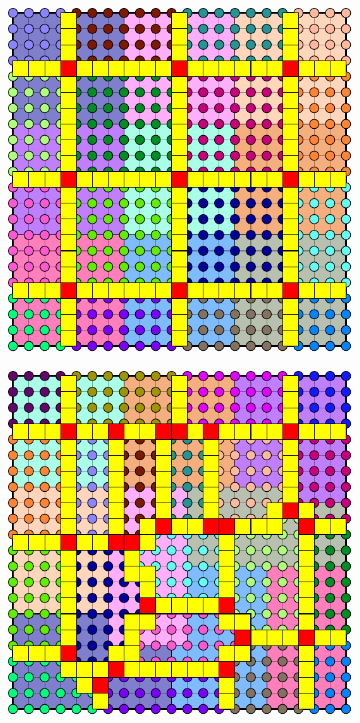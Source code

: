 \begin{figure}[htbp]
  \begin{subfigure}[t]{0.3\textwidth}
    \centerline{\includegraphics[width=0.9\linewidth]{figs/square/square_cart_struct_cell_dual_nomerge}}
  \end{subfigure}
  \hfill
  \begin{subfigure}[t]{0.3\textwidth}
    \centerline{\includegraphics[width=0.9\linewidth]{figs/square/square_cart_metis_cell_dual_nomerge}}

\end{subfigure}
\end{figure}
